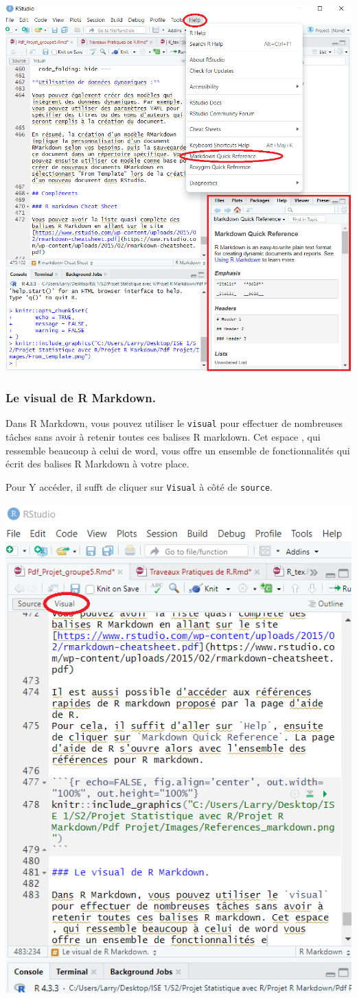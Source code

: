 \documentclass[
  12pt,
]{article}
\begin{document}
\begin{center}\includegraphics[width=0.7\linewidth,height=0.7\textheight]{../Document_Rmarkdown/Images/References_markdown} \end{center}

\subsubsection{Le visual de R Markdown.}\label{le-visual-de-r-markdown.}

Dans R Markdown, vous pouvez utiliser le \texttt{visual} pour effectuer
de nombreuses tâches sans avoir à retenir toutes ces balises R markdown.
Cet espace , qui ressemble beaucoup à celui de word, vous offre un
ensemble de fonctionnalités qui écrit des balises R Markdown à votre
place.

Pour Y accéder, il sufft de cliquer sur \texttt{Visual} à côté de
\texttt{source}.

\begin{center}\includegraphics[width=0.6\linewidth,height=0.6\textheight]{../Document_Rmarkdown/Images/Visual} \end{center}
\end{document}
